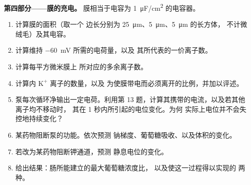 \begin{problem}
\medskip
\noindent\textbf{第四部分——膜的充电。}
膜相当于电容为 \qty{1}{\micro F/cm^2} 的电容器。
\begin{enumerate}[resume]
  \item 计算膜的面积（取一个
        边长分别为 \qty{25}{\micro m}、\qty{5}{\micro m}、\qty{5}{\micro m} 的长方体，
        不计微绒毛）及其电容。
  \item 计算维持 \qty{-60}{mV} 所需的电荷量，以及
        其所代表的一价离子数。
  \item 计算每平方微米膜上
        所对应的多余离子数。
  \item 计算内 $\mathrm{K^+}$ 离子的数量，以及
        为使膜带电而必须离开的比例，并加以评述。
  \item 泵每次循环净输出一定电荷。利用第
        13 题，计算其携带的电流，以及若其他离子均不移动时，
        其在 1 秒内所引起的电位变化。为何
        实际上电位并不会失控地持续变化？
  \item 某药物阻断泵的功能。依次预测
        钠梯度、葡萄糖吸收、以及体积的变化。
  \item 若改为某药物阻断钾通道，预测
        静息电位的变化。
  \item 给出结果：肠所能建立的最大葡萄糖浓度比，
        以及使这一过程得以实现的
        两种。
\end{enumerate}
\end{problem}
